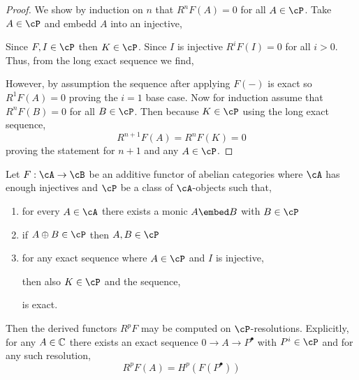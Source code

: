 \documentclass[12pt]{article}
\begin{document}
\begin{proof}
We show by induction on $n$ that $R^n F(A) = 0$ for all $A \in \cP$. Take $A \in \cP$ and embedd $A$ into an injective,
\begin{center}
\end{center}
Since $F, I \in \cP$ then $K \in \cP$. Since $I$ is injective $R^i F(I) = 0$ for all $i  > 0$. Thus, from the long exact sequence we find,
\begin{center}
\end{center} 
\begin{center}
\end{center} 
However, by assumption the sequence after applying $F(-)$ is exact so $R^1 F(A) = 0$ proving the $i = 1$ base case. Now for induction assume that $R^n F(B) = 0$ for all $B \in \cP$. Then  because $K \in \cP$ using the long exact sequence,
\[ R^{n+1} F(A) = R^n F(K) = 0 \]
proving the statement for $n + 1$ and any $A \in \cP$. 
\end{proof}

\begin{prop}
Let $F : \cA \to \cB$ be an additive functor of abelian categories where $\cA$ has enough injectives and $\cP$ be a class of $\cA$-objects such that,
\begin{enumerate}
\item for every $A \in \cA$ there exists a monic $A \embed B$ with $B \in \cP$
\item if $A \oplus B \in \cP$ then $A, B \in \cP$
\item for any exact sequence where $A \in \cP$ and $I$ is injective,
\begin{center}
\end{center} 
then also $K \in \cP$ and the sequence,
\begin{center}
\end{center}
is exact.
\end{enumerate}
Then the derived functors $R^p F$ may be computed on $\cP$-resolutions. Explicitly, for any $A \in \mathbb{C}$ there exists an exact sequence $0 \to A \to P^\bullet$ with $P^i \in \cP$ and for any such resolution,
\[ R^p F(A) = H^p(F(P^\bullet)) \]
\end{prop}
\end{document}
